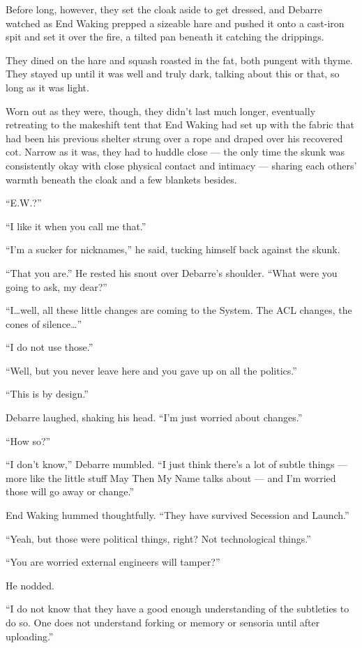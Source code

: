 Before long, however, they set the cloak aside to get dressed, and Debarre watched as End Waking prepped a sizeable hare and pushed it onto a cast-iron spit and set it over the fire, a tilted pan beneath it catching the drippings.

They dined on the hare and squash roasted in the fat, both pungent with thyme. They stayed up until it was well and truly dark, talking about this or that, so long as it was light.

Worn out as they were, though, they didn't last much longer, eventually retreating to the makeshift tent that End Waking had set up with the fabric that had been his previous shelter strung over a rope and draped over his recovered cot. Narrow as it was, they had to huddle close — the only time the skunk was consistently okay with close physical contact and intimacy — sharing each others' warmth beneath the cloak and a few blankets besides.

``E.W.?''

``I like it when you call me that.''

``I'm a sucker for nicknames,'' he said, tucking himself back against the skunk.

``That you are.'' He rested his snout over Debarre's shoulder. ``What were you going to ask, my dear?''

``I\ldots well, all these little changes are coming to the System. The ACL changes, the cones of silence\ldots{}''

``I do not use those.''

``Well, but you never leave here and you gave up on all the politics.''

``This is by design.''

Debarre laughed, shaking his head. ``I'm just worried about changes.''

``How so?''

``I don't know,'' Debarre mumbled. ``I just think there's a lot of subtle things — more like the little stuff May Then My Name talks about — and I'm worried those will go away or change.''

End Waking hummed thoughtfully. ``They have survived Secession and Launch.''

``Yeah, but those were political things, right? Not technological things.''

``You are worried external engineers will tamper?''

He nodded.

``I do not know that they have a good enough understanding of the subtleties to do so. One does not understand forking or memory or sensoria until after uploading.''

